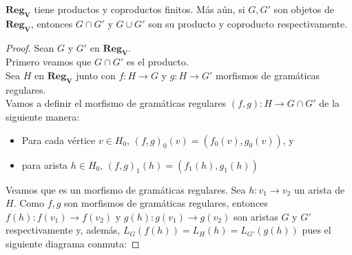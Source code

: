 \documentclass[../main.tex]{subfiles}
\begin{document}
 \begin{prop}
	$\mathbf{Reg_V}$ tiene productos y coproductos finitos. Más aún, si $G, G'$ son objetos de $\mathbf{Reg_V}$, entonces $G\cap G'$ y $G\cup G'$ son su producto y coproducto respectivamente. 
 \end{prop}
 \begin{proof}
 	Sean $G$ y $G'$ en $\mathbf{Reg_V}$. \\
 	Primero veamos que $G\cap G'$ es el producto. \\
 	Sea $H$ en $\mathbf{Reg_V}$ junto con $f:H \to G$ y $g:H \to G'$ morfismos de gramáticas regulares. \\
 	Vamos a definir el morfismo de gramáticas regulares $(f,g):H \to G\cap G'$ de la siguiente manera:
 	\begin{itemize}
		\item Para cada vértice $v \in H_0$, $(f,g)_0(v)=(f_0(v),g_0(v))$, y
		\item para arista $h\in H_0$, $(f,g)_1(h)=(f_1(h),g_1(h))$
 	\end{itemize}
 	Veamos que es un morfismo de gramáticas regulares. Sea $h:v_1 \to v_2$ un arista de $H$. Como $f,g$ son morfismos de gramáticas regulares, entonces $f(h): f(v_1)\to f(v_2)$ y $g(h): g(v_1)\to g(v_2)$ son aristas $G$ y $G'$ respectivamente y, además, $L_G(f(h))=L_H(h)=L_{G'}(g(h))$ pues el siguiente diagrama conmuta: 
 	

\end{proof}
\end{document}
